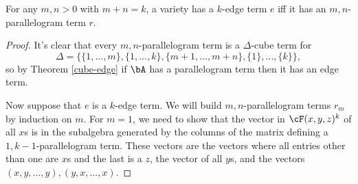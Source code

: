 \begin{thm} For any $m,n > 0$ with $m+n = k$, a variety has a $k$-edge term $e$ iff it has an $m,n$-parallelogram term $r$.
\end{thm}
\begin{proof} It's clear that every $m,n$-parallelogram term is a $\Delta$-cube term for
\[
\Delta = \{\{1, ..., m\}, \{1, ..., k\}, \{m+1, ..., m+n\}, \{1\}, ..., \{k\}\},
\]
so by Theorem \ref{cube-edge} if $\bA$ has a parallelogram term then it has an edge term.

Now suppose that $e$ is a $k$-edge term. We will build $m,n$-parallelogram terms $r_m$ by induction on $m$. For $m = 1$, we need to show that the vector in $\cF(x,y,z)^k$ of all $x$s is in the subalgebra generated by the columns of the matrix defining a $1,k-1$-parallelogram term. These vectors are the vectors where all entries other than one are $x$s and the last is a $z$, the vector of all $y$s, and the vectors $(x,y,...,y), (y,x,...,x)$.


\end{proof}
